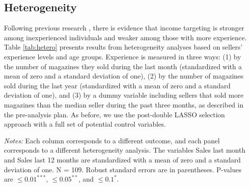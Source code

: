 \documentclass[12pt]{article}
\begin{document}
\subsection{Heterogeneity}
Following previous research \citep[e.g.,][]{farber2015taxi}, there is evidence that income targeting is stronger among inexperienced individuals and weaker among those with more experience. Table \ref{tab:hetero} presents results from heterogeneity analyses based on sellers’ experience levels and age groups. Experience is measured in three ways: (1) by the number of magazines they sold during the last month (standardized with a mean of zero and a standard deviation of one), (2) by the number of magazines sold during the last year (standardized with a mean of zero and a standard deviation of one), and (3) by a dummy variable including sellers that sold more magazines than the median seller during the past three months, as described in the pre-analysis plan. As before, we use the post-double LASSO selection approach with a full set of potential control variables.

\begin{table}
\caption{\label{tab:hetero} Heterogeneity}
\vspace{-0.8em}
\begin{threeparttable}[H]

\begin{subtable}[h]{\textwidth}
\caption{\label{tab:h_a} Sales last month (std)}
\resizebox{\textwidth}{!}{\scriptsize }
\end{subtable}

\begin{subtable}[h]{\textwidth}
\caption{\label{tab:h_b} Sales last year (std)}
\resizebox{\textwidth}{!}{\scriptsize }
\end{subtable}

\begin{subtable}[h]{\textwidth}
\caption{\label{tab:h_c} Sales last three months dummy (median 467)}
\resizebox{\textwidth}{!}{\scriptsize }
\end{subtable}

\begin{subtable}[h]{\textwidth}
\caption{\label{tab:h_d} Age (std)}
\resizebox{\textwidth}{!}{\scriptsize }
\end{subtable}

\begin{tablenotes}
\small
\begin{minipage}{\textwidth}
\textit{Notes:} Each column corresponds to a different outcome, and each panel corresponds to a different heterogeneity analysis. The variables Sales last month and Sales last 12 months are standardized with a mean of zero and a standard deviation of one. N = 109. Robust standard errors are in parentheses. P-values are $\leq 0.01^{***}$,  $\leq 0.05^{**}$, and $\leq 0.1^{*}$.
\end{minipage}
\end{tablenotes}

\end{threeparttable}
\end{table}
\end{document}
